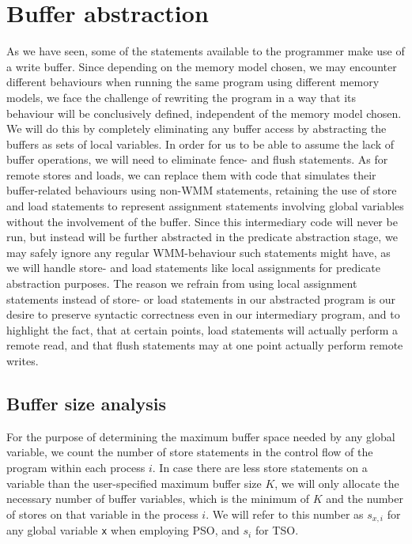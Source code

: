 \section{Buffer abstraction}

As we have seen, some of the statements available to the programmer make use of a write buffer. Since depending on the memory model chosen, we may encounter different behaviours when running the same program using different memory models, we face the challenge of rewriting the program in a way that its behaviour will be conclusively defined, independent of the memory model chosen. We will do this by completely eliminating any buffer access by abstracting the buffers as sets of local variables. In order for us to be able to assume the lack of buffer operations, we will need to eliminate fence- and flush statements. As for remote stores and loads, we can replace them with code that simulates their buffer-related behaviours using non-WMM statements, retaining the use of store and load statements to represent assignment statements involving global variables without the involvement of the buffer. Since this intermediary code will never be run, but instead will be further abstracted in the predicate abstraction stage, we may safely ignore any regular WMM-behaviour such statements might have, as we will handle store- and load statements like local assignments for predicate abstraction purposes. The reason we refrain from using local assignment statements instead of store- or load statements in our abstracted program is our desire to preserve syntactic correctness even in our intermediary program, and to highlight the fact, that at certain points, load statements will actually perform a remote read, and that flush statements may at one point actually perform remote writes.\\

\subsection{Buffer size analysis}

For the purpose of determining the maximum buffer space needed by any global variable, we count the number of store statements in the control flow of the program within each process $i$. In case there are less store statements on a variable than the user-specified maximum buffer size $K$, we will only allocate the necessary number of buffer variables, which is the minimum of $K$ and the number of stores on that variable in the process $i$. We will refer to this number as $s_{x,i}$ for any global variable \lstinline$x$ when employing PSO, and $s_i$ for TSO.\\

